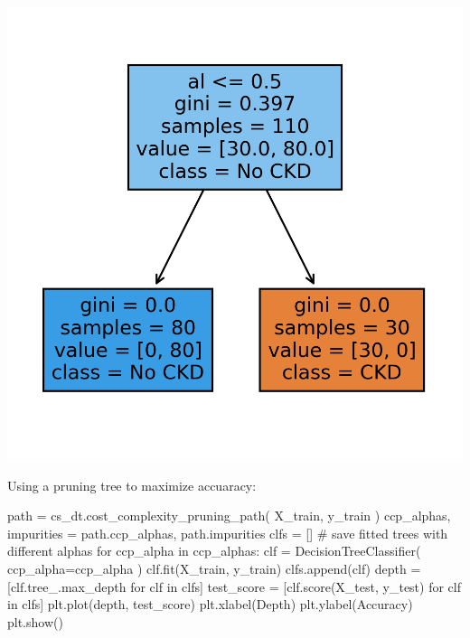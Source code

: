 \documentclass[
  11pt,
  letterpaper,
  DIV=11,
  numbers=noendperiod]{scrartcl}
\newenvironment{Shaded}{\begin{snugshade}}{\end{snugshade}}
\newcommand{\CommentTok}[1]{\textcolor[rgb]{0.37,0.37,0.37}{#1}}
\newcommand{\ControlFlowTok}[1]{\textcolor[rgb]{0.00,0.23,0.31}{#1}}
\newcommand{\KeywordTok}[1]{\textcolor[rgb]{0.00,0.23,0.31}{#1}}
\newcommand{\NormalTok}[1]{\textcolor[rgb]{0.00,0.23,0.31}{#1}}
\newcommand{\OperatorTok}[1]{\textcolor[rgb]{0.37,0.37,0.37}{#1}}
\newcommand{\StringTok}[1]{\textcolor[rgb]{0.13,0.47,0.30}{#1}}
\begin{document}
\includegraphics{Seebach_Lily_HW6_files/figure-pdf/cell-21-output-2.png}

Using a pruning tree to maximize accuaracy:

\begin{Shaded}
\begin{Highlighting}[]
\NormalTok{path }\OperatorTok{=}\NormalTok{ cs\_dt.cost\_complexity\_pruning\_path(}
\NormalTok{    X\_train, }
\NormalTok{    y\_train}
\NormalTok{)}
\NormalTok{ccp\_alphas, impurities }\OperatorTok{=}\NormalTok{ path.ccp\_alphas, path.impurities}
\NormalTok{clfs }\OperatorTok{=}\NormalTok{ [] }\CommentTok{\# save fitted trees with different alphas}
\ControlFlowTok{for}\NormalTok{ ccp\_alpha }\KeywordTok{in}\NormalTok{ ccp\_alphas:}
\NormalTok{    clf }\OperatorTok{=}\NormalTok{ DecisionTreeClassifier(}
\NormalTok{        ccp\_alpha}\OperatorTok{=}\NormalTok{ccp\_alpha}
\NormalTok{        )}
\NormalTok{    clf.fit(X\_train, y\_train)}
\NormalTok{    clfs.append(clf)}
\NormalTok{depth }\OperatorTok{=}\NormalTok{ [clf.tree\_.max\_depth }\ControlFlowTok{for}\NormalTok{ clf }\KeywordTok{in}\NormalTok{ clfs]}
\NormalTok{test\_score }\OperatorTok{=}\NormalTok{ [clf.score(X\_test, y\_test) }\ControlFlowTok{for}\NormalTok{ clf }\KeywordTok{in}\NormalTok{ clfs]}
\NormalTok{plt.plot(depth, test\_score)}
\NormalTok{plt.xlabel(}\StringTok{\textquotesingle{}Depth\textquotesingle{}}\NormalTok{)}
\NormalTok{plt.ylabel(}\StringTok{\textquotesingle{}Accuracy\textquotesingle{}}\NormalTok{)}
\NormalTok{plt.show()}
\end{Highlighting}
\end{Shaded}
\end{document}
